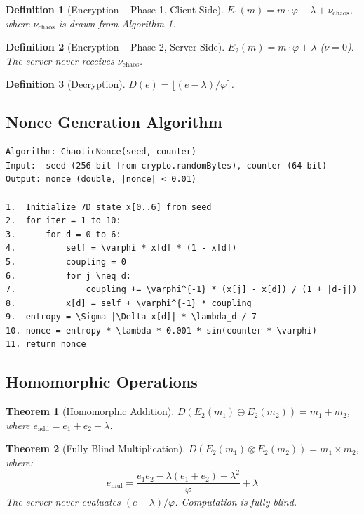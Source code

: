 \documentclass{article}
\newtheorem{theorem}{Theorem}[section]
\newtheorem{definition}{Definition}[section]
\begin{document}
\begin{definition}[Encryption -- Phase 1, Client-Side]
$E_1(m) = m \cdot \varphi + \lambda + \nu_{\text{chaos}}$, where $\nu_{\text{chaos}}$ is drawn from Algorithm 1.
\end{definition}

\begin{definition}[Encryption -- Phase 2, Server-Side]
$E_2(m) = m \cdot \varphi + \lambda$ ($\nu = 0$). The server never receives $\nu_{\text{chaos}}$.
\end{definition}

\begin{definition}[Decryption]
$D(e) = \lfloor (e - \lambda) / \varphi \rceil$.
\end{definition}

\subsection{Nonce Generation Algorithm}

\begin{lstlisting}[basicstyle=\ttfamily\small, frame=single, label={alg:nonce}]
Algorithm: ChaoticNonce(seed, counter)
Input:  seed (256-bit from crypto.randomBytes), counter (64-bit)
Output: nonce (double, |nonce| < 0.01)

1.  Initialize 7D state x[0..6] from seed
2.  for iter = 1 to 10:
3.      for d = 0 to 6:
4.          self = \varphi * x[d] * (1 - x[d])
5.          coupling = 0
6.          for j \neq d:
7.              coupling += \varphi^{-1} * (x[j] - x[d]) / (1 + |d-j|)
8.          x[d] = self + \varphi^{-1} * coupling
9.  entropy = \Sigma |\Delta x[d]| * \lambda_d / 7
10. nonce = entropy * \lambda * 0.001 * sin(counter * \varphi)
11. return nonce
\end{lstlisting}

\subsection{Homomorphic Operations}

\begin{theorem}[Homomorphic Addition]
$D(E_2(m_1) \oplus E_2(m_2)) = m_1 + m_2$, where $e_{\text{add}} = e_1 + e_2 - \lambda$.
\end{theorem}

\begin{theorem}[Fully Blind Multiplication]
$D(E_2(m_1) \otimes E_2(m_2)) = m_1 \times m_2$, where:
\begin{equation}
e_{\text{mul}} = \frac{e_1 e_2 - \lambda(e_1 + e_2) + \lambda^2}{\varphi} + \lambda
\end{equation}
The server never evaluates $(e - \lambda)/\varphi$. Computation is fully blind.
\end{theorem}
\end{document}
